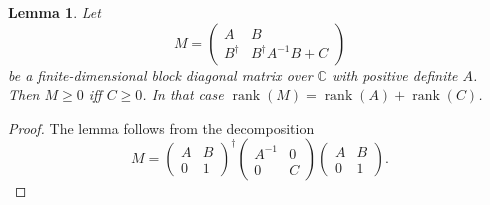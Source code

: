 \documentclass[
  american,aps,pra,reprint,floatfix,nofootinbib,superscriptaddress
]{revtex4-2}
\DeclareMathOperator{\rank}{rank}
\newtheorem{lemma}[theorem]{Lemma}
\begin{document}
\begin{lemma}
  \label{lm:block-diagonal}
  Let
  \begin{equation}
    M = \begin{pmatrix}A & B \\ B^{\dagger} & B^{\dagger} A^{-1} B + C\end{pmatrix}
  \end{equation}
  be a finite-dimensional block diagonal matrix over $\mathbb{C}$ with
  positive definite $A$.
  Then $M \geq 0$ iff $C \geq 0$.
  In that case $\rank(M) = \rank(A) + \rank(C)$.
\end{lemma}
\begin{proof}
  The lemma follows from the decomposition
  \begin{equation}
    M =
      \begin{pmatrix}A & B \\ 0 & 1\end{pmatrix}^{\dagger}
      \begin{pmatrix}A^{-1} & 0 \\ 0 & C\end{pmatrix}
      \begin{pmatrix}A & B \\ 0 & 1\end{pmatrix}.
  \end{equation}
\end{proof}
\end{document}
